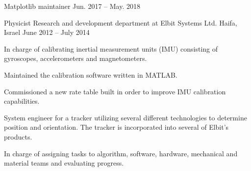 

\begin{cventries}

  \cventry
    {Matplotlib maintainer} %
    {} %
    {} %
    {Jun. 2017 -- May. 2018} %
    {
      \begin{cvitems} %
      \end{cvitems}
    }

    \cventry
    {Physicist} %
    {Research and development department at Elbit Systems Ltd.} %
    {Haifa, Israel} %
    {June 2012 -- July 2014} %
    {
      \begin{cvitems} %
        \item {In charge of calibrating inertial measurement units (IMU) consisting of gyroscopes, accelerometers and magnetometers.}
        \item {Maintained the calibration software written in MATLAB.}
        \item {Commissioned a new rate table built in order to improve IMU calibration capabilities.}
        \item {System engineer for a tracker utilizing several different technologies to determine position and orientation. The tracker is incorporated into several of Elbit's products.}
        \item {In charge of assigning tasks to algorithm, software, hardware, mechanical and material teams and evaluating progress.}
      \end{cvitems}
    }


  \end{cventries}

